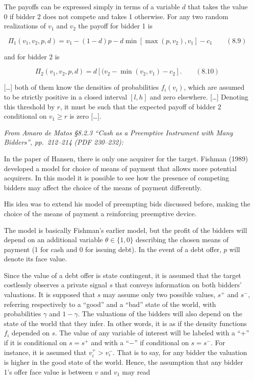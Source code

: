 \documentclass[11pt,a4paper]{article}
\begin{document}
The payoffs can be expressed simply in terms of a variable \(d\) that takes the value 0 if bidder 2
does not compete and takes 1 otherwise. For any two random realizations of \(v_1\) and \(v_2\) the
payoff for bidder 1 is

\[\Pi_1(v_1, v_2, p, d) = v_1 - (1 - d)p - d \min[\max(p, v_2), v_1] - c_1 \qquad (8.9)\]

and for bidder 2 is

\[\Pi_2(v_1, v_2, p, d) = d[(v_2 - \min(v_2, v_1) - c_2]. \qquad (8.10)\]

{[}\ldots{]} both of them know the densities of probabilities \(f_i(v_i)\), which are assumed to be
strictly positive in a closed interval \([l, h]\) and zero elsewhere. {[}\ldots{]} Denoting this
threshold by \(r\), it must be such that the expected payoff of bidder 2 conditional on
\(v_1 \geq r\) is zero {[}\ldots{]}.

\emph{From Amaro de Matos §8.2.3 ``Cash as a Preemptive Instrument with Many Bidders'', pp.~212--214
(PDF 230--232):}

In the paper of Hansen, there is only one acquirer for the target. Fishman (1989) developed a model
for choice of means of payment that allows more potential acquirers. In this model it is possible to
see how the presence of competing bidders may affect the choice of the means of payment differently.

His idea was to extend his model of preempting bids discussed before, making the choice of the means
of payment a reinforcing preemptive device.

The model is basically Fishman's earlier model, but the profit of the bidders will depend on an
additional variable \(\theta \in \{1, 0\}\) describing the chosen means of payment (1 for cash and 0
for issuing debt). In the event of a debt offer, \(p\) will denote its face value.

Since the value of a debt offer is state contingent, it is assumed that the target costlessly
observes a private signal \(s\) that conveys information on both bidders' valuations. It is supposed
that \(s\) may assume only two possible values, \(s^+\) and \(s^-\), referring respectively to a
``good'' and a ``bad'' state of the world, with probabilities \(\gamma\) and \(1 - \gamma\). The
valuations of the bidders will also depend on the state of the world that they infer. In other
words, it is as if the density functions \(f_i\) depended on \(s\). The value of any variable of
interest will be labeled with a ``+'' if it is conditional on \(s = s^+\) and with a ``−'' if
conditional on \(s = s^-\). For instance, it is assumed that \(v_i^+ > v_i^-\). That is to say, for
any bidder the valuation is higher in the good state of the world. Hence, the assumption that any
bidder 1's offer face value is between \(v\) and \(v_1\) may read
\end{document}
